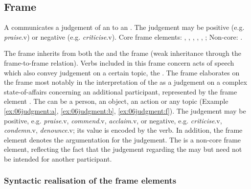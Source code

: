 \documentclass[output=paper,colorlinks,citecolor=brown]{langscibook}
\begin{document}
\subsection{Frame }

\begin{description}[font=\normalfont]
\item[Definition of the frame \framename{Judgment\_communication}:] A  communicates a judgement of an  to an . The judgement may be positive (e.g. \textit{praise}.v) or negative (e.g. \textit{criticise}.v). Core frame elements: , , , , , ; Non-core: .
\end{description}

The frame  inherits from both the  and the  frame (weak inheritance through the  frame-to-frame relation). Verbs included in this frame concern acts of speech which also convey judgement on a certain topic, the . The frame elaborates on the frame  most notably in the interpretation of the  as a judgement on a complex state-of-affairs concerning an additional participant, represented by the frame element . The  can be a person, an object, an action or any topic (Example \ref{ex:06judgment:a}, \ref{ex:06judgment:b}, \ref{ex:06judgment:f}). The judgement may be positive, e.g. \textit{praise}.v, \textit{commend}.v, \textit{acclaim}.v, or negative, e.g. \textit{criticise}.v, \textit{condemn}.v, \textit{denounce}.v; its value is encoded by the verb. In addition, the frame element  denotes the argumentation for the judgement. The  is a non-core frame element, reflecting the fact that the judgement regarding the  may but need not be intended for another participant. %

\subsubsection{Syntactic realisation of the  frame elements}
\end{document}
